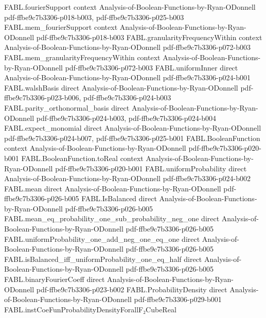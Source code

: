 \begin{theorem}
  {FABL.fourierSupport}
  {context}
  {Analysis-of-Boolean-Functions-by-Ryan-ODonnell}
  {pdf-ffbe9c7b3306-p018-b003,
    pdf-ffbe9c7b3306-p025-b003}
\proofstep
  {FABL.mem_fourierSupport}
  {context}
  {Analysis-of-Boolean-Functions-by-Ryan-ODonnell}
  {pdf-ffbe9c7b3306-p018-b003}
\proofstep
  {FABL.granularityFrequencyWithin}
  {context}
  {Analysis-of-Boolean-Functions-by-Ryan-ODonnell}
  {pdf-ffbe9c7b3306-p072-b003}
\proofstep
  {FABL.mem_granularityFrequencyWithin}
  {context}
  {Analysis-of-Boolean-Functions-by-Ryan-ODonnell}
  {pdf-ffbe9c7b3306-p072-b003}
\proofstep
  {FABL.uniformInner}
  {direct}
  {Analysis-of-Boolean-Functions-by-Ryan-ODonnell}
  {pdf-ffbe9c7b3306-p024-b001}
\proofstep
  {FABL.walshBasis}
  {direct}
  {Analysis-of-Boolean-Functions-by-Ryan-ODonnell}
  {pdf-ffbe9c7b3306-p023-b006,
    pdf-ffbe9c7b3306-p024-b003}
\proofstep
  {FABL.parity_orthonormal_basis}
  {direct}
  {Analysis-of-Boolean-Functions-by-Ryan-ODonnell}
  {pdf-ffbe9c7b3306-p024-b003,
    pdf-ffbe9c7b3306-p024-b004}
\proofstep
  {FABL.expect_monomial}
  {direct}
  {Analysis-of-Boolean-Functions-by-Ryan-ODonnell}
  {pdf-ffbe9c7b3306-p024-b007,
    pdf-ffbe9c7b3306-p025-b001}
\proofstep
  {FABL.BooleanFunction}
  {context}
  {Analysis-of-Boolean-Functions-by-Ryan-ODonnell}
  {pdf-ffbe9c7b3306-p020-b001}
\proofstep
  {FABL.BooleanFunction.toReal}
  {context}
  {Analysis-of-Boolean-Functions-by-Ryan-ODonnell}
  {pdf-ffbe9c7b3306-p020-b001}
\proofstep
  {FABL.uniformProbability}
  {direct}
  {Analysis-of-Boolean-Functions-by-Ryan-ODonnell}
  {pdf-ffbe9c7b3306-p024-b002}
\proofstep
  {FABL.mean}
  {direct}
  {Analysis-of-Boolean-Functions-by-Ryan-ODonnell}
  {pdf-ffbe9c7b3306-p026-b005}
\proofstep
  {FABL.IsBalanced}
  {direct}
  {Analysis-of-Boolean-Functions-by-Ryan-ODonnell}
  {pdf-ffbe9c7b3306-p026-b005}
\proofstep
  {FABL.mean_eq_probability_one_sub_probability_neg_one}
  {direct}
  {Analysis-of-Boolean-Functions-by-Ryan-ODonnell}
  {pdf-ffbe9c7b3306-p026-b005}
\proofstep
  {FABL.uniformProbability_one_add_neg_one_eq_one}
  {direct}
  {Analysis-of-Boolean-Functions-by-Ryan-ODonnell}
  {pdf-ffbe9c7b3306-p026-b005}
\proofstep
  {FABL.isBalanced_iff_uniformProbability_one_eq_half}
  {direct}
  {Analysis-of-Boolean-Functions-by-Ryan-ODonnell}
  {pdf-ffbe9c7b3306-p026-b005}
\proofstep
  {FABL.binaryFourierCoeff}
  {direct}
  {Analysis-of-Boolean-Functions-by-Ryan-ODonnell}
  {pdf-ffbe9c7b3306-p023-b002}
\proofstep
  {FABL.ProbabilityDensity}
  {direct}
  {Analysis-of-Boolean-Functions-by-Ryan-ODonnell}
  {pdf-ffbe9c7b3306-p029-b001}
\proofstep
  {FABL.instCoeFunProbabilityDensityForallF₂CubeReal}

\end{theorem}

